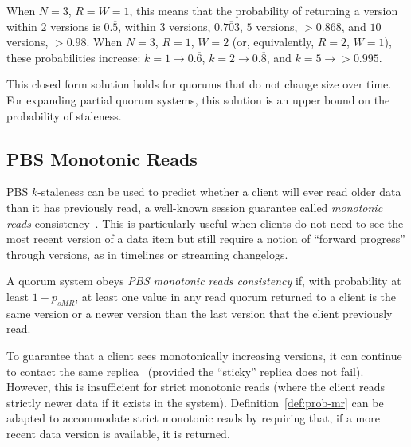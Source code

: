 \documentclass{vldb}
\newcommand{\subsectionskip}{-0em}
\begin{document}
When $N$$=$$3$, $R$$=$$W$$=$$1$, this means that the probability of
returning a version within $2$ versions is $0.\overline{5}$, within $3$
versions, $0.\overline{703}$, $5$ versions, $> 0.868$, and $10$
versions, $>0.98$.  When $N$$=$$3$, $R$$=$$1$, $W$$=$$2$ (or, equivalently,
$R$$=$$2$, $W$$=$$1$), these probabilities increase: $k$$=$$1
\rightarrow 0.\overline{6}$, $k$$=$$2 \rightarrow 0.\overline{8}$, and
$k$$=$$5 \rightarrow > 0.995$.

This closed form solution holds for quorums that do not change size
over time.  For expanding partial quorum systems, this solution is an
upper bound on the probability of staleness.

\vspace{\subsectionskip}\subsection{PBS Monotonic Reads}

PBS $k$-staleness can be used to predict whether a client will ever
read older data than it has previously read, a well-known session
guarantee called \textit{monotonic reads}
consistency~\cite{sessionguarantees}.  This is particularly useful
when clients do not need to see the most recent version of a data item
but still require a notion of ``forward progress'' through versions,
as in timelines or streaming changelogs.

\begin{definition}
\label{def:prob-mr}
A quorum system obeys \textit{PBS monotonic reads consistency} if,
with probability at least $1-p_{sMR}$, at least one value in any
read quorum returned to a client is the same version or a newer
version than the last version that the client previously read.
\end{definition}

To guarantee that a client sees monotonically increasing versions, it
can continue to contact the same replica~\cite{vogels-defs} (provided
the ``sticky'' replica does not fail).  However, this is insufficient
for strict monotonic reads (where the client reads strictly newer data
if it exists in the system).  Definition~\ref{def:prob-mr} can be
adapted to accommodate strict monotonic reads by requiring that, if a
more recent data version is available, it is returned.
\end{document}
